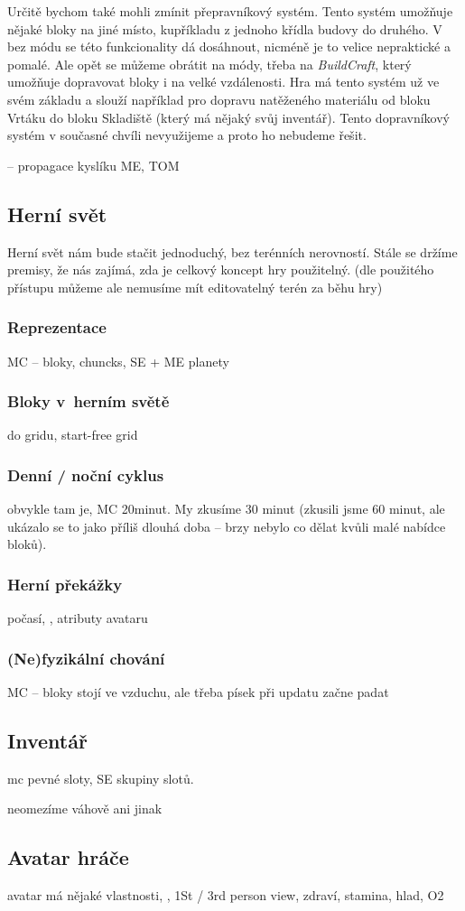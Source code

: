 Určitě bychom také mohli zmínit přepravníkový systém. Tento systém umožňuje  nějaké bloky na jiné místo, kupříkladu z jednoho křídla budovy do druhého. V  bez módu se této funkcionality dá dosáhnout, nicméně je to velice nepraktické a pomalé. Ale opět se můžeme obrátit na módy, třeba na \textit{BuildCraft}, který umožňuje dopravovat bloky i na velké vzdálenosti. Hra \SE{} má tento systém už ve svém základu a slouží například pro dopravu natěženého materiálu od bloku Vrtáku do bloku Skladiště (který má nějaký svůj inventář). Tento dopravníkový systém v současné chvíli nevyužijeme a proto ho nebudeme řešit.

-- propagace kyslíku ME, TOM

\subsection{Herní svět}

Herní svět nám bude stačit jednoduchý, bez terénních nerovností. Stále se držíme premisy, že nás zajímá, zda je celkový koncept hry použitelný. (dle použitého přístupu můžeme ale nemusíme mít editovatelný terén za běhu hry)

\subsubsection{Reprezentace}

MC -- bloky, chuncks, SE + ME planety

\subsubsection{Bloky v~herním světě}

do gridu, start-free grid


\subsubsection{Denní / noční cyklus}

obvykle tam je, MC 20minut. My zkusíme 30 minut (zkusili jsme 60 minut, ale ukázalo se to jako příliš dlouhá doba -- brzy nebylo co dělat kvůli malé nabídce bloků).

\subsubsection{Herní překážky}

počasí, \NPC{}, atributy avataru

\subsubsection{(Ne)fyzikální chování}

MC -- bloky stojí ve vzduchu, ale třeba písek při updatu začne padat

\subsection{Inventář}

mc pevné sloty, SE skupiny slotů.

neomezíme váhově ani jinak 

\subsection{Avatar hráče}
avatar má nějaké vlastnosti, \HUD{}, 1St / 3rd person view, zdraví, stamina, hlad, O2



